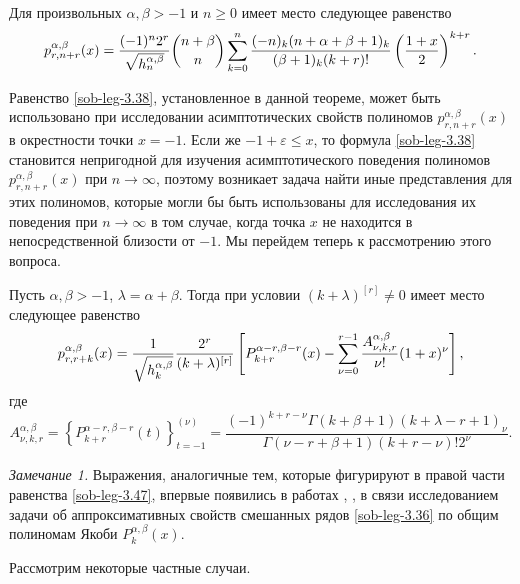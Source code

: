 \begin{theorem} Для произвольных $\alpha, \beta>-1$ и $n\ge0$
имеет место следующее равенство
\begin{equation}\label{sob-leg-3.38}%
p_{r,n+r}^{\alpha,\beta}(x)=\frac{(-1)^n2^{r}}{\sqrt{ h_n^{\alpha,\beta}}}
{n+\beta\choose n}
\sum_{k=0}^n{(-n)_k(n+\alpha+\beta+1)_k\over (\beta+1)_k(k+r)!}
\left({1+x\over 2}\right)^{k+r}.
\end{equation}
\end{theorem}

Равенство \eqref{sob-leg-3.38}, установленное в данной теореме, может быть использовано при исследовании асимптотических свойств полиномов $p_{r,n+r}^{\alpha,\beta}(x)$ в окрестности точки $x=-1$. Если же $-1+\varepsilon\le x$, то формула  \eqref{sob-leg-3.38} становится непригодной для изучения асимптотического  поведения полиномов  $p_{r,n+r}^{\alpha,\beta}(x)$ при $n\to\infty$, поэтому возникает задача найти иные представления для этих полиномов, которые могли бы быть использованы для исследования их поведения при $n\to\infty$ в том случае, когда точка $x$ не находится в непосредственной близости от $-1$. Мы перейдем теперь к рассмотрению этого вопроса.
\begin{theorem} Пусть $\alpha, \beta>-1$, $\lambda=\alpha+\beta$. Тогда  при условии $(k+\lambda)^{[r]}\neq0$ имеет место следующее равенство
\begin{equation}\label{sob-leg-3.47}
p_{r,r+k}^{\alpha,\beta}(x) ={1\over\sqrt{ h_k^{\alpha,\beta}}}
\frac{2^r}{(k+\lambda)^{[r]}}\left[P_{k+r}^{\alpha-r,\beta-r}(x)
-\sum^{r-1}_{\nu=0}\frac{A_{\nu,k,r}^{\alpha,\beta}}{\nu!}(1+x)^{\nu}\right] ,
\end{equation}
где
\begin{equation}\label{sob-leg-3.45}
A_{\nu,k,r}^{\alpha,\beta}=\left\{P_{k+r}^{\alpha-r,\beta-r}(t)\right\}_{t=-1}^{(\nu)}=
\frac{(-1)^{k+r-\nu}\Gamma(k+\beta+1)(k+\lambda-r+1)_{\nu}}
{\Gamma(\nu-r+\beta+1)(k+r-\nu)!2^\nu}.
\end{equation}
\end{theorem}


 \textit{Замечание 1.} Выражения, аналогичные тем, которые фигурируют в правой части равенства  \eqref{sob-leg-3.47}, впервые появились в   работах \cite{sob-leg-Shar13}, \cite{sob-leg-Shar17}, \cite{sob-leg-Shar18} в связи исследованием задачи об аппроксимативных свойств смешанных рядов \eqref{sob-leg-3.36} по общим полиномам Якоби $P_{k}^{\alpha,\beta}(x)$.

  Рассмотрим некоторые частные случаи.

